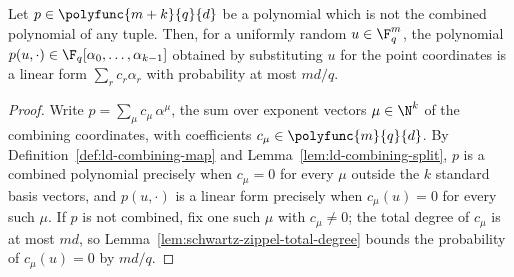 \begin{lemma}
	\label{lem:ld-combining-exact-linearity}
	\leanok
	Let $p \in \polyfunc{m+k}{q}{d}$ be a polynomial which is not the combined
	polynomial of any tuple.  Then, for a uniformly random $u \in \F_q^m$, the
	polynomial $p(u,\cdot) \in \F_q[\alpha_0,\ldots,\alpha_{k-1}]$ obtained by
	substituting $u$ for the point coordinates is a linear form
	$\sum_r c_r \alpha_r$ with probability at most $md/q$.
\end{lemma}
\begin{proof}
	\leanok
	Write $p = \sum_{\mu} c_\mu \, \alpha^\mu$, the sum over exponent vectors
	$\mu \in \N^k$ of the combining coordinates, with coefficients
	$c_\mu \in \polyfunc{m}{q}{d}$.  By
	Definition~\ref{def:ld-combining-map} and
	Lemma~\ref{lem:ld-combining-split}, $p$ is a combined polynomial precisely
	when $c_\mu = 0$ for every $\mu$ outside the $k$ standard basis vectors, and
	$p(u,\cdot)$ is a linear form precisely when $c_\mu(u) = 0$ for every such
	$\mu$.  If $p$ is not combined, fix one such $\mu$ with $c_\mu \neq 0$; the
	total degree of $c_\mu$ is at most $md$, so
	Lemma~\ref{lem:schwartz-zippel-total-degree} bounds the probability of
	$c_\mu(u) = 0$ by $md/q$.
\end{proof}

